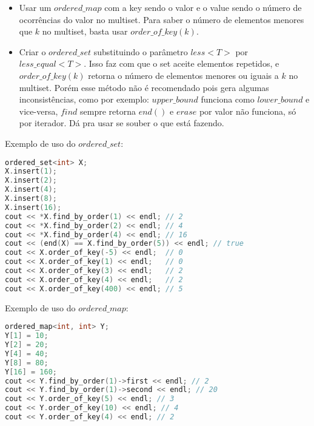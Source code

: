 \documentclass[10pt, a4paper, oneside]{book}
\begin{document}
\begin{itemize}
\item Usar um $ordered\_map$ com a key sendo o valor e o value sendo o número de ocorrências do valor no multiset. Para saber o número de elementos menores que $k$ no multiset, basta usar $order\_of\_key(k)$.
\end{itemize}



\begin{itemize}
\item Criar o $ordered\_set$ substituindo o parâmetro $less<T>$ por $less\_equal<T>$. Isso faz com que o set aceite elementos repetidos, e $order\_of\_key(k)$ retorna o número de elementos menores ou iguais a $k$ no multiset. Porém esse método não é recomendado pois gera algumas inconsistências, como por exemplo: $upper\_bound$ funciona como $lower\_bound$ e vice-versa, $find$ sempre retorna $end()$ e $erase$ por valor não funciona, só por iterador. Dá pra usar se souber o que está fazendo.
\end{itemize}



Exemplo de uso do $ordered\_set$:



\begin{lstlisting}[language=C++]
ordered_set<int> X;
X.insert(1);
X.insert(2);
X.insert(4);
X.insert(8);
X.insert(16);
cout << *X.find_by_order(1) << endl; // 2
cout << *X.find_by_order(2) << endl; // 4
cout << *X.find_by_order(4) << endl; // 16
cout << (end(X) == X.find_by_order(5)) << endl; // true
cout << X.order_of_key(-5) << endl;  // 0
cout << X.order_of_key(1) << endl;   // 0
cout << X.order_of_key(3) << endl;   // 2
cout << X.order_of_key(4) << endl;   // 2
cout << X.order_of_key(400) << endl; // 5
\end{lstlisting}



Exemplo de uso do $ordered\_map$:



\begin{lstlisting}[language=C++]
ordered_map<int, int> Y;
Y[1] = 10;
Y[2] = 20;
Y[4] = 40;
Y[8] = 80;
Y[16] = 160;
cout << Y.find_by_order(1)->first << endl; // 2
cout << Y.find_by_order(1)->second << endl; // 20
cout << Y.order_of_key(5) << endl; // 3
cout << Y.order_of_key(10) << endl; // 4
cout << Y.order_of_key(4) << endl; // 2
\end{lstlisting}

\hfill
\end{document}
